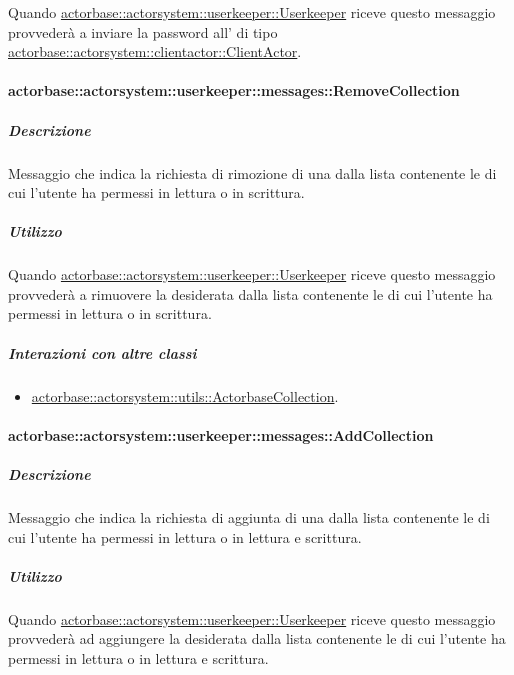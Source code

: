 \documentclass{scalatekids-article}
\begin{document}
Quando \hyperref[sec:actorbase::actorsystem::userkeeper::Userkeeper]{actorbase::\allowbreak{}actorsystem::\allowbreak{}userkeeper::\allowbreak{}Userkeeper}
riceve questo messaggio provvederà a inviare la password all' di tipo
\hyperref[sec:actorbase::actorsystem::clientactor::ClientActor]{actorbase::\allowbreak{}actorsystem::\allowbreak{}clientactor::\allowbreak{}ClientActor}.

\paragraph{actorbase::actorsystem::userkeeper::messages::RemoveCollection}
\label{sec:actorbase::actorsystem::userkeeper::messages::RemoveCollection}

\subparagraph{Descrizione}

Messaggio che indica la richiesta di rimozione di una  dalla
lista contenente le  di cui l'utente ha permessi in lettura
o in scrittura.

\subparagraph{Utilizzo}

Quando \hyperref[sec:actorbase::actorsystem::userkeeper::Userkeeper]{actorbase::\allowbreak{}actorsystem::\allowbreak{}userkeeper::\allowbreak{}Userkeeper}
riceve questo messaggio provvederà a rimuovere la  desiderata
dalla lista contenente le  di cui l'utente ha permessi in
lettura o in scrittura.

\subparagraph{Interazioni con altre classi}
\begin{itemize}
\item \hyperref[sec:actorbase::actorsystem::utils::ActorbaseCollection]{actorbase::actorsystem::utils::ActorbaseCollection}.
\end{itemize}

\paragraph{actorbase::actorsystem::userkeeper::messages::AddCollection}
\label{sec:actorbase::actorsystem::userkeeper::messages::AddCollection}

\subparagraph{Descrizione}

Messaggio che indica la richiesta di aggiunta di una  dalla
lista contenente le  di cui l'utente ha permessi in lettura
o in lettura e scrittura.

\subparagraph{Utilizzo}

Quando \hyperref[sec:actorbase::actorsystem::userkeeper::Userkeeper]{actorbase::\allowbreak{}actorsystem::\allowbreak{}userkeeper::\allowbreak{}Userkeeper}
riceve questo messaggio provvederà ad aggiungere la  desiderata
dalla lista contenente le  di cui l'utente ha permessi in
lettura o in lettura e scrittura.
\end{document}
